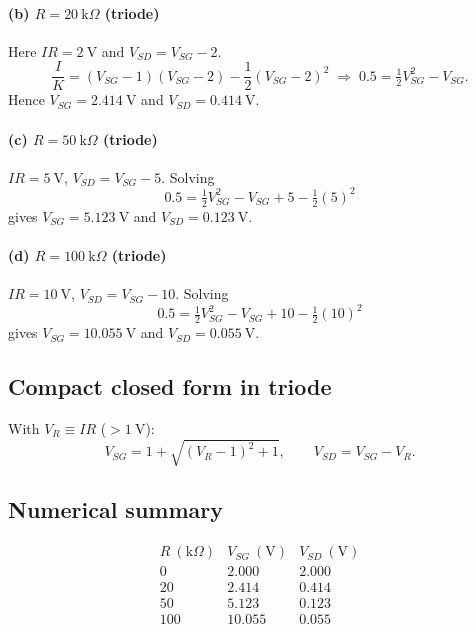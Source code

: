 \documentclass[12pt]{article}
\begin{document}
\paragraph{(b) \(R=20~\text{k}\Omega\) (triode)}
Here \(IR=2~\text{V}\) and \(V_{SD}=V_{SG}-2\).
\[
\frac{I}{K}=(V_{SG}-1)(V_{SG}-2)-\frac12(V_{SG}-2)^2
\;\Rightarrow\; 0.5=\tfrac12 V_{SG}^2 - V_{SG}.
\]
Hence \(V_{SG}=2.414~\text{V}\) and \(V_{SD}=0.414~\text{V}\).

\paragraph{(c) \(R=50~\text{k}\Omega\) (triode)}
\(IR=5~\text{V}\), \(V_{SD}=V_{SG}-5\).
Solving
\[
0.5=\tfrac12 V_{SG}^2 - V_{SG} + 5 - \tfrac12(5)^2
\]
gives \(V_{SG}=5.123~\text{V}\) and \(V_{SD}=0.123~\text{V}\).

\paragraph{(d) \(R=100~\text{k}\Omega\) (triode)}
\(IR=10~\text{V}\), \(V_{SD}=V_{SG}-10\).
Solving
\[
0.5=\tfrac12 V_{SG}^2 - V_{SG} + 10 - \tfrac12(10)^2
\]
gives \(V_{SG}=10.055~\text{V}\) and \(V_{SD}=0.055~\text{V}\).

\subsection*{Compact closed form in triode}
With \(V_R\equiv IR\) (\(>1~\text{V}\)):
\[
V_{SG}=1+\sqrt{(V_R-1)^2+1},\qquad V_{SD}=V_{SG}-V_R.
\]

\subsection*{Numerical summary}
\[
\begin{array}{c|c|c}
R~(\text{k}\Omega) & V_{SG}~(\text{V}) & V_{SD}~(\text{V})\\ \hline
0 & 2.000 & 2.000\\
20 & 2.414 & 0.414\\
50 & 5.123 & 0.123\\
100 & 10.055 & 0.055
\end{array}
\]
\end{document}

